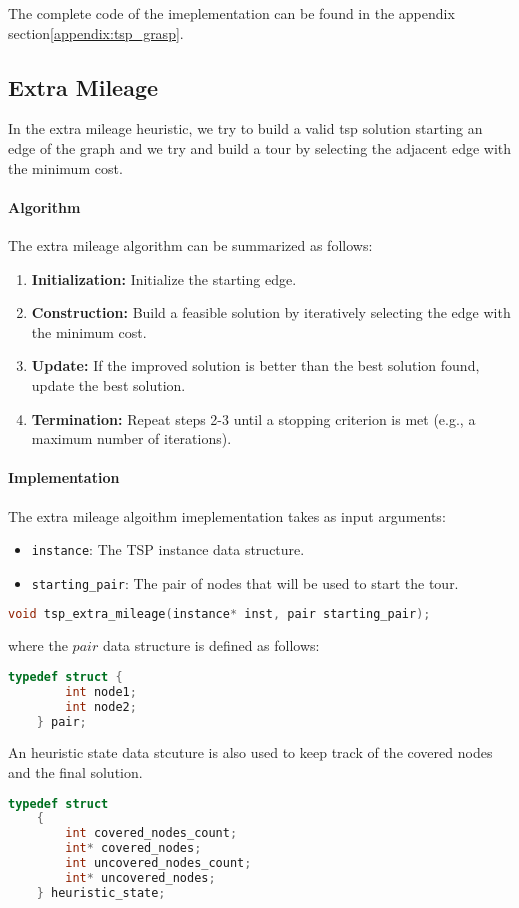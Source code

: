 \documentclass{article}
\begin{document}
The complete code of the imeplementation can be found in the appendix section\ref{appendix:tsp_grasp}.

\subsection{Extra Mileage}
In the extra mileage heuristic, we try to build a valid tsp solution starting an edge of the graph and we try and build a tour by selecting the adjacent edge with the minimum cost.

\paragraph{Algorithm}
The extra mileage algorithm can be summarized as follows:
\begin{enumerate}
	\item \textbf{Initialization:} Initialize the starting edge.
	\item \textbf{Construction:} Build a feasible solution by iteratively selecting the edge with the minimum cost.
	\item \textbf{Update:} If the improved solution is better than the best solution found, update the best solution.
	\item \textbf{Termination:} Repeat steps 2-3 until a stopping criterion is met (e.g., a maximum number of iterations).
\end{enumerate}

\paragraph{Implementation}
The extra mileage algoithm imeplementation takes as input arguments:
\begin{itemize}
	\item \texttt{instance}: The TSP instance data structure.
	\item \texttt{starting\_pair}: The pair of nodes that will be used to start the tour.
\end{itemize}
\begin{lstlisting}[language=C]
	void tsp_extra_mileage(instance* inst, pair starting_pair);
\end{lstlisting}
where the $pair$ data structure is defined as follows:
\begin{lstlisting}[language=C]
	typedef struct {
		int node1;
		int node2;
	} pair;
\end{lstlisting}
An heuristic state data stcuture is also used to keep track of the covered nodes and the final solution.
\begin{lstlisting}[language=C]
	typedef struct
	{
		int covered_nodes_count;
		int* covered_nodes;
		int uncovered_nodes_count;
		int* uncovered_nodes;
	} heuristic_state;
\end{lstlisting}
\end{document}

